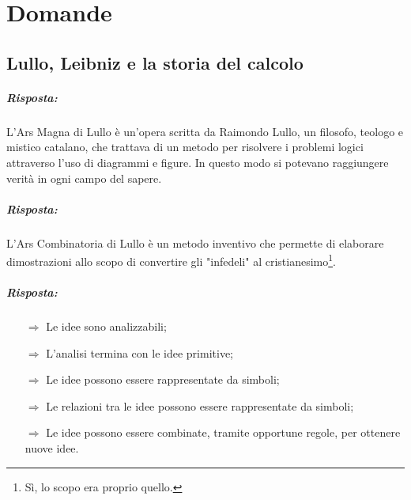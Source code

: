 \chapter{Domande}

\section{Lullo, Leibniz e la storia del calcolo}


\paragraph{Risposta:} L'Ars Magna di Lullo è un'opera scritta da Raimondo Lullo, un filosofo, teologo e mistico catalano,
che trattava di un metodo per risolvere i problemi logici attraverso l'uso di diagrammi e figure.
In questo modo si potevano raggiungere verità in ogni campo del sapere.

\subsubsection{}


\paragraph{Risposta:} L'Ars Combinatoria di Lullo è un metodo inventivo
che permette di elaborare dimostrazioni allo scopo di convertire gli "infedeli" al cristianesimo\footnote{Sì, lo scopo era proprio quello.}.   

\subsubsection{}


\paragraph{Risposta:}

\begin{itemize}
    \item [$\Rightarrow$] Le idee sono analizzabili;
    \item [$\Rightarrow$] L'analisi termina con le idee primitive;
    \item [$\Rightarrow$] Le idee possono essere rappresentate da simboli;
    \item [$\Rightarrow$] Le relazioni tra le idee possono essere rappresentate da simboli;
    \item [$\Rightarrow$] Le idee possono essere combinate, tramite opportune regole, per ottenere nuove idee.
\end{itemize}

